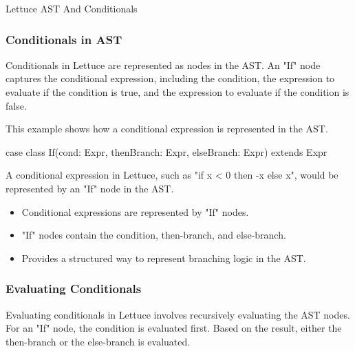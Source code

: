 \begin{notes}{Lettuce AST And Conditionals}
\begin{highlight}
    \end{highlight}
    
    \subsubsection*{Conditionals in AST}
    
    Conditionals in Lettuce are represented as nodes in the AST. An "If" node captures the conditional expression, including the condition, the expression to evaluate if the condition is true, and 
    the expression to evaluate if the condition is false.
    
    \begin{highlight}
    
        This example shows how a conditional expression is represented in the AST.
    
    \begin{code}[Scala]
    case class If(cond: Expr, thenBranch: Expr, elseBranch: Expr) extends Expr
    \end{code}
    
        A conditional expression in Lettuce, such as "if x < 0 then -x else x", would be represented by an "If" node in the AST.
    
        \begin{itemize}
            \item Conditional expressions are represented by "If" nodes.
            \item "If" nodes contain the condition, then-branch, and else-branch.
            \item Provides a structured way to represent branching logic in the AST.
        \end{itemize}
    
    \end{highlight}
    
    \subsubsection*{Evaluating Conditionals}
    
    Evaluating conditionals in Lettuce involves recursively evaluating the AST nodes. For an "If" node, the condition is evaluated first. Based on the result, either the then-branch or the else-branch is evaluated.
    
    \begin{highlight}
    

\end{highlight}
\end{notes}
